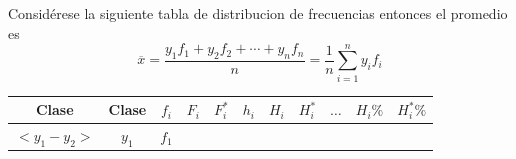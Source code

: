 \documentclass[10pt,]{krantz}
\theoremstyle{definition}
\theoremstyle{definition}
\theoremstyle{definition}
\theoremstyle{definition}
\theoremstyle{remark}
\begin{document}
Considérese la siguiente tabla de distribucion de frecuencias entonces el promedio es \[\overline{x}=\frac{y_1f_1+y_2f_2+\cdots+y_nf_n}{n}=\frac{1}{n}\sum_{i=1}^ny_if_i\]

\begin{longtable}[]{@{}cccccccccll@{}}
\toprule
\begin{minipage}[b]{0.09\columnwidth}\centering
Clase\strut
\end{minipage} & \begin{minipage}[b]{0.05\columnwidth}\centering
Clase\strut
\end{minipage} & \begin{minipage}[b]{0.05\columnwidth}\centering
\(f_i\)\strut
\end{minipage} & \begin{minipage}[b]{0.05\columnwidth}\centering
\(F_i\)\strut
\end{minipage} & \begin{minipage}[b]{0.05\columnwidth}\centering
\(F_i^*\)\strut
\end{minipage} & \begin{minipage}[b]{0.09\columnwidth}\centering
\(h_i\)\strut
\end{minipage} & \begin{minipage}[b]{0.09\columnwidth}\centering
\(H_i\)\strut
\end{minipage} & \begin{minipage}[b]{0.10\columnwidth}\centering
\(H_i^*\)\strut
\end{minipage} & \begin{minipage}[b]{0.05\columnwidth}\centering
\(\ldots\)\strut
\end{minipage} & \begin{minipage}[b]{0.05\columnwidth}\raggedright
\(H_i\%\)\strut
\end{minipage} & \begin{minipage}[b]{0.05\columnwidth}\raggedright
\(H_i^*\%\)\strut
\end{minipage}\tabularnewline
\midrule
\endhead
\begin{minipage}[t]{0.09\columnwidth}\centering
\(<y_1-y_2>\)\strut
\end{minipage} & \begin{minipage}[t]{0.05\columnwidth}\centering
\(y_1\)\strut
\end{minipage} & \begin{minipage}[t]{0.05\columnwidth}\centering
\(f_1\)\strut
\end{minipage} & \begin{minipage}[t]{0.05\columnwidth}\centering

\end{minipage}
\end{longtable}
\end{document}

